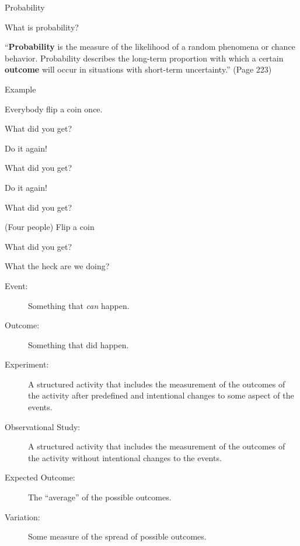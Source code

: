 \begin{frame}{Probability}

  What is probability?

  \begin{definition}[Probability]
    ``\textbf{Probability} is the measure of the likelihood of a random
    phenomena or chance behavior. Probability describes the long-term
    proportion with which a certain \textbf{outcome} will occur in
    situations with short-term uncertainty.'' (Page 223)
  \end{definition}

  
\end{frame}

\begin{frame}{Example}

  Everybody flip a coin once.

  {

    What did you get?

  }

  {

    Do it again!

  }

  {

    What did you get?

  }

  {

    Do it again!

  }

  {

    What did you get?

  }


  {

    (Four people) Flip a coin

  }

  {

    What did you get?

  }

  
\end{frame}

\begin{frame}{What the heck are we doing?}

  \begin{description}
  \item[Event:] Something that \textit{can} happen.
  \item[Outcome:] Something that did happen.
  \item[Experiment:] A structured activity that includes the
    measurement of the outcomes of the activity after predefined and
    intentional changes to some aspect of the events.
  \item[Observational Study:] A structured activity that includes the
    measurement of the outcomes of the activity without intentional
    changes to the events.
  \item[Expected Outcome:] The ``average'' of the possible outcomes.
  \item[Variation:] Some measure of the spread of possible outcomes.
  \end{description}
  
\end{frame}

